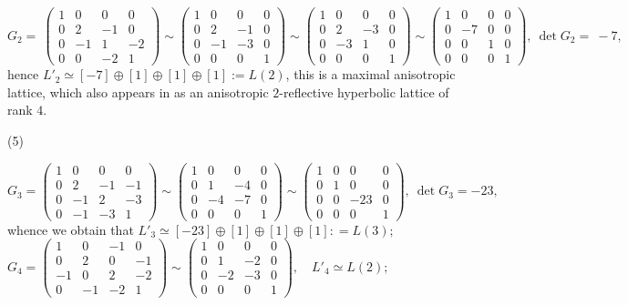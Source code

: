 \documentclass[14pt]{article}
\begin{document}
\begin{small}
$
G_{2} =~
\begin{pmatrix}
1 & 0 & 0 & 0\\
0 & 2 & -1 & 0\\
0 & -1 & 1 & -2\\
0 & 0 & -2 & 1
\end{pmatrix} \sim
\begin{pmatrix}
1 & 0 & 0 & 0\\
0 & 2 & -1 & 0\\
0 & -1 & -3 & 0\\
0 & 0 & 0 & 1
\end{pmatrix}\sim
\begin{pmatrix}
1 & 0 & 0 & 0\\
0 & 2 & -3 & 0\\
0 & -3 & 1 & 0\\
0 & 0 & 0 & 1
\end{pmatrix}\sim
\begin{pmatrix}
1 & 0 & 0 & 0\\
0 & -7 & 0 & 0\\
0 & 0 & 1 & 0\\
0 & 0 & 0 & 1
\end{pmatrix},  ~\det G_2 =~-7,
$
hence $L'_2 \simeq [-7] \oplus [1] \oplus [1] \oplus [1]:=L(2)$,
this is a maximal anisotropic lattice,
which also
appears in \cite{vinberg07classhyplat} as an anisotropic
$2$-reflective hyperbolic lattice of rank $4$.

\vskip 1cm

(5)

\vskip 1cm

$
G_{3} =
\begin{pmatrix}
1 & 0 & 0 & 0\\
0 & 2 & -1 & -1\\
0 & -1 & 2 & -3\\
0 & -1 & -3 & 1
\end{pmatrix} \sim
\begin{pmatrix}
1 & 0 & 0 & 0\\
0 & 1 & -4 & 0\\
0 & -4 & -7 & 0\\
0 & 0 & 0 & 1
\end{pmatrix}\sim
\begin{pmatrix}
1 & 0 & 0 & 0\\
0 & 1 & 0 & 0\\
0 & 0 & -23 & 0\\
0 & 0 & 0 & 1
\end{pmatrix}, \ \det G_3 = -23,
$
\vskip 0.4cm
whence we obtain that $L'_3 \simeq [-23] \oplus [1] \oplus [1] \oplus [1]:
= L(3);$
\vskip 0.4cm
$
G_{4} =
\begin{pmatrix}
1 & 0 & -1 & 0\\
0 & 2 & 0 & -1\\
-1 & 0 & 2 & -2\\
0 & -1 & -2 & 1
\end{pmatrix} \sim
\begin{pmatrix}
1 & 0 & 0 & 0\\
0 & 1 & -2 & 0\\
0 & -2 & -3 & 0\\
0 & 0 & 0 & 1
\end{pmatrix}, \quad
L'_4 \simeq L(2);$


\end{small}
\end{document}
